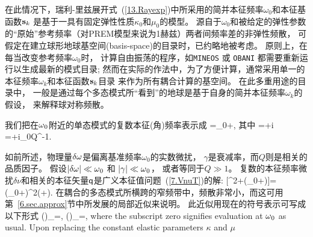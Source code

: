 {{在此情况下，瑞利-里兹展开式~(\ref{13.Rayexp})中所采用的简并本征频率$\omega_0$和本征基函数$\mbox{${\bf s}$}_k$
是基于一具有固定弹性性质$\kappa_0$和$\mu_0$的模型。
源自于$\omega_0$和被给定的弹性参数的“原始”参考频率（对PREM模型来说为1赫兹）两者间频率差的非弹性频散，
可假定在建立球形地球基空间(basis-space)的目录时，已约略地被考虑。
原则上，在每当改变参考频率$\omega_0$时，
计算自由振荡的程序，如{\tt MINEOS\/} 或 {\tt OBANI\/}
%
%
都需要重新运行以生成最新的模式目录;
然而在实际的作法中，为了方便计算，通常采用单一的本征频率$\omega_k$和本征函数$\mbox{${\bf s}$}_k$目录
来作为所有耦合计算的基空间。
在此多重用途的目录中，
一般是通过每个多态模式所“看到”的地球是基于自身的简并本征频率$\omega_k$的假设，
来解释球对称频散。

我们把在$\mbox{$\omega$}_0$附近的单态模式的复数本征(角)频率表示成
\eq \label{13.nuexp}
\nu=\om_0+\delta\nu,
\en
其中
\eq
\delta\nu=\delta\om+i\gamma
=\delta\om+\half i\om_0Q^{-1}.
\en

如前所述，物理量$\delta\mbox{$\omega$}$是偏离基准频率$\omega_0$的实数微扰，
$\gamma$是衰减率，而$Q$则是相关的品质因子。
假设$|\delta\mbox{$\omega$}|\ll\mbox{$\omega$}_0$ 和 $|\gamma|\ll\mbox{$\omega$}_0$，
或者等同于$Q\gg 1$。
复数的本征频率微扰$\delta\nu$和相关的本征矢量$\mbox{${\sf q}$}$是广义本征值问题~(\ref{7.VnuT})的解:
\eq \label{13.VTan}
[\ssOmega^2+\ssV(\om_0+\delta\nu)]\ssq=
(\om_0+\delta\nu)^2(\ssI+\ssT)\ssq.
\en
在耦合的多态模式所横跨的窄频带中，频散非常小，而这可用第~\ref{6.sec.approx}节中所发展的局部近似来说明。
此近似用现在的符号表示可写成以下形式
\eq \label{13.linapp}
\left(\right)_{}=,
\qquad
\left(\right)_{}=,
\en
\iffalse
where the subscript zero signifies evaluation at $\mbox{$\omega$}_0$ as usual.
Upon replacing the constant elastic parameters $\kappa$ and $\mu$
}}
